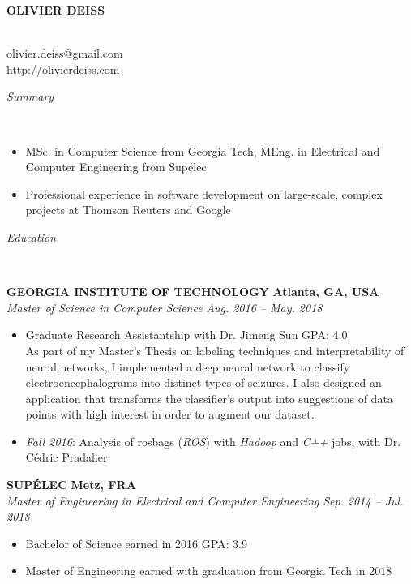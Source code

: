 \documentclass[a4paper, 12pt]{article}
\newcommand{\marginline}{-0.3cm}
\newcommand{\margincontent}{-0.6cm}
\newcommand{\margincontentnotextbefore}{-0.3cm}
\newcommand{\marginbeforesection}{0.35cm}
\newcommand{\linewidthperso}{0.02cm}
\newcommand{\styletitle}[1]{\textbf{#1}}
\newcommand{\styledesc}[1]{\textit{#1}}
\newcommand{\styleloc}[1]{\textbf{#1}}
\newcommand{\styledates}[1]{\textit{#1}}
\newcommand{\stylesection}[1]{
  \vspace{\marginbeforesection}
  \begin{normalsize}\textit{#1}\end{normalsize}
  \vspace{\marginline}\\
  \noindent\makebox[\linewidth]{\rule{\textwidth}{\linewidthperso}}

}
\begin{document}
\begin{footnotesize}

\begin{center}
  \begin{small}\textbf{OLIVIER DEISS}\end{small}\\
  olivier.deiss@gmail.com\\
  \url{http://olivierdeiss.com}
\end{center}

\stylesection{Summary}

\vspace{\margincontentnotextbefore}
\begin{itemize}
  \item MSc. in Computer Science from Georgia Tech, MEng. in Electrical and Computer Engineering from Sup\'elec
  \item Professional experience in software development on large-scale, complex projects at Thomson Reuters and Google
\end{itemize}

\stylesection{Education}

\styletitle{GEORGIA INSTITUTE OF TECHNOLOGY} \hfill \styleloc{Atlanta, GA, USA}\\
\styledesc{Master of Science in Computer Science} \hfill \styledates{Aug. 2016 -- May. 2018}\\
\vspace{\margincontent}
\begin{itemize}
  \item Graduate Research Assistantship with Dr. Jimeng Sun \hfill GPA: 4.0 \\
  As part of my Master's Thesis on labeling techniques and interpretability of neural networks, I implemented a deep neural network to classify electroencephalograms into distinct types of seizures. I also designed an application that transforms the classifier's output into suggestions of data points with high interest in order to augment our dataset.
  \item \textit{Fall 2016}: Analysis of rosbags (\textit{ROS}) with \textit{Hadoop} and \textit{C++} jobs, with Dr. C\'edric Pradalier
\end{itemize}

\styletitle{SUP\'ELEC} \hfill \styleloc{Metz, FRA}\\
\styledesc{Master of Engineering in Electrical and Computer Engineering} \hfill \styledates{Sep. 2014 -- Jul. 2018}\\
\vspace{\margincontent}
\begin{itemize}
  \item Bachelor of Science earned in 2016 \hfill GPA: 3.9
  \item Master of Engineering earned with graduation from Georgia Tech in 2018
\end{itemize}


\end{footnotesize}
\end{document}
